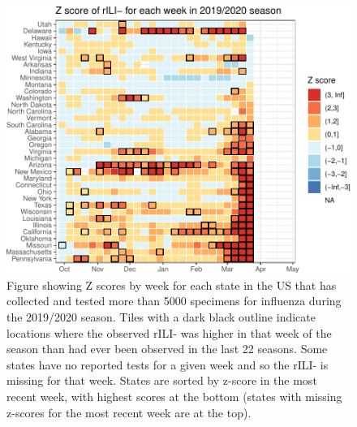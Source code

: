 \documentclass[]{article}
\begin{document}
\begin{figure}
\centering
\includegraphics{ili-labtest-report_files/figure-latex/calc-avg-sd-all-states-1.pdf}
\caption{Figure showing Z scores by week for each state in the US that
has collected and tested more than 5000 specimens for influenza during
the 2019/2020 season. Tiles with a dark black outline indicate locations
where the observed rILI- was higher in that week of the season than had
ever been observed in the last 22 seasons. Some states have no reported
tests for a given week and so the rILI- is missing for that week. States
are sorted by z-score in the most recent week, with highest scores at
the bottom (states with missing z-scores for the most recent week are at
the top).}
\end{figure}
\end{document}

